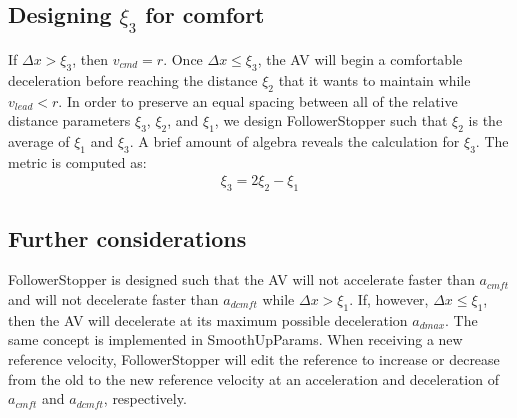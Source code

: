 \documentclass[conference]{IEEEtran}
\begin{document}
\subsection{Designing $\xi_3$ for comfort}
If $\Delta x>\xi_3$, then $v_{cmd}=r$. Once $\Delta x\leq \xi_3$, the AV will begin a comfortable deceleration before reaching the distance $\xi_2$ that it wants to maintain while $v_{lead}<r$. In order to preserve an equal spacing between all of the relative distance parameters $\xi_3$, $\xi_2$, and $\xi_1$, we design FollowerStopper such that $\xi_2$ is the average of $\xi_1$ and $\xi_3$. A brief amount of algebra reveals the calculation for $\xi_3$. The metric is computed as:
\begin{eqnarray}
\xi_3 = 2\xi_2-\xi_1
\end{eqnarray}

\subsection{Further considerations}
FollowerStopper is designed such that the AV will not accelerate faster than $a_{cmft}$ and will not decelerate faster than $a_{dcmft}$ while $\Delta x > \xi_1$. If, however, $\Delta x\leq \xi_1$, then the AV will decelerate at its maximum possible deceleration $a_{dmax}$. The same concept is implemented in SmoothUpParams. When receiving a new reference velocity, FollowerStopper will edit the reference to increase or decrease from the old to the new reference velocity at an acceleration and deceleration of $a_{cmft}$ and $a_{dcmft}$, respectively.






%
%
\end{document}
